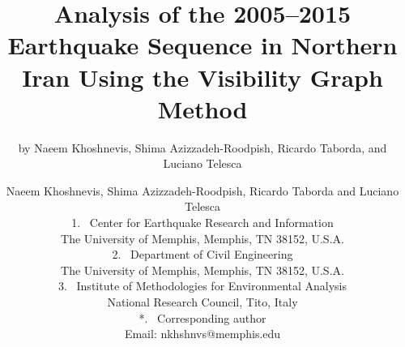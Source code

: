 
\title{%
    Analysis of the 2005--2015 Earthquake Sequence in Northern Iran Using the Visibility Graph Method
}

\makeatletter
\if@twocolumn
    \date{}
    \renewcommand*\@fnsymbol[1]{\the#1}
    \author{by Naeem Khoshnevis, Shima Azizzadeh-Roodpish, Ricardo Taborda, and Luciano Telesca}
\else
    \author{
        Naeem Khoshnevis, Shima Azizzadeh-Roodpish, Ricardo Taborda and Luciano Telesca\\
        \normalsize\normalfont    	    	
        \vspace{20pt}
        1.~
        Center for Earthquake Research and Information\\
        \hspace{1.1em} The University of Memphis, Memphis, TN 38152, U.S.A.\\
        \vspace{20pt}
        2.~
        Department of Civil Engineering\\
        \hspace{1.1em} The University of Memphis, Memphis, TN 38152, U.S.A.\\
        \vspace{20pt}
        3.~
        Institute of Methodologies for Environmental Analysis\\
        \hspace{1.1em} National Research Council, Tito, Italy\\
        \vspace{20pt}
        *.~
        Corresponding author\\
        \hspace{1.1em} Email: nkhshnvs@memphis.edu\\
        \vspace{40pt}
    }
\fi
\makeatother

